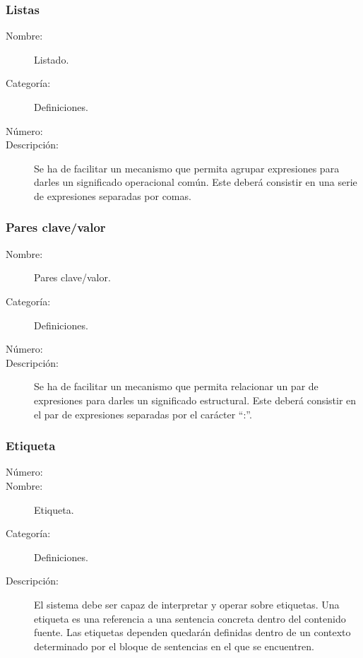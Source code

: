 \subsubsection{Listas}

\begin{framed}
	\begin{description}
		\item [Nombre:] Listado.
		\item [Categoría:] Definiciones.
		\item [Número:] \cn
		\item [Descripción:] Se ha de facilitar un mecanismo que permita agrupar expresiones para darles un significado operacional
		común. Este deberá consistir en una serie de expresiones separadas por comas.
	\end {description}
\end{framed}

\subsubsection{Pares clave/valor}
\begin{framed}
	\begin{description}
		\item [Nombre:] Pares clave/valor.
		\item [Categoría:] Definiciones.
		\item [Número:] \cn
		\item [Descripción:] Se ha de facilitar un mecanismo que permita relacionar un par de expresiones para darles un significado estructural.
		Este deberá consistir en el par de expresiones separadas por el carácter ``:''.
	\end {description}
\end{framed}

\subsubsection{Etiqueta}
\begin{framed}
	\begin{description}
		\item [Número:] \cn
		\item [Nombre:] Etiqueta.
		\item [Categoría:] Definiciones.
		\item [Descripción:] El sistema debe ser capaz de interpretar y operar sobre etiquetas. Una etiqueta es una referencia
		a una sentencia concreta dentro del contenido fuente. Las etiquetas dependen quedarán definidas dentro de un contexto determinado por
		el bloque de sentencias en el que se encuentren.
	\end {description}
\end{framed}

